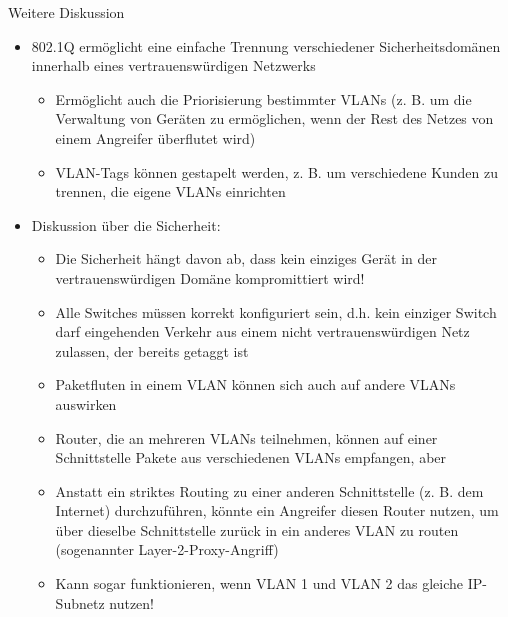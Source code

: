 \documentclass[a4paper]{article}
\begin{document}
\begin{multicols}{3}
    Weitere Diskussion

    \begin{itemize}
        \item
              802.1Q ermöglicht eine einfache Trennung verschiedener
              Sicherheitsdomänen innerhalb eines vertrauenswürdigen Netzwerks

              \begin{itemize}
                  \item
                        Ermöglicht auch die Priorisierung bestimmter VLANs (z. B. um die
                        Verwaltung von Geräten zu ermöglichen, wenn der Rest des Netzes von
                        einem Angreifer überflutet wird)
                  \item
                        VLAN-Tags können gestapelt werden, z. B. um verschiedene Kunden zu
                        trennen, die eigene VLANs einrichten
              \end{itemize}
        \item
              Diskussion über die Sicherheit:

              \begin{itemize}
                  \item
                        Die Sicherheit hängt davon ab, dass kein einziges Gerät in der
                        vertrauenswürdigen Domäne kompromittiert wird!
                  \item
                        Alle Switches müssen korrekt konfiguriert sein, d.h. kein einziger
                        Switch darf eingehenden Verkehr aus einem nicht vertrauenswürdigen
                        Netz zulassen, der bereits getaggt ist
                  \item
                        Paketfluten in einem VLAN können sich auch auf andere VLANs
                        auswirken
                  \item
                        Router, die an mehreren VLANs teilnehmen, können auf einer
                        Schnittstelle Pakete aus verschiedenen VLANs empfangen, aber
                  \item
                        Anstatt ein striktes Routing zu einer anderen Schnittstelle (z. B.
                        dem Internet) durchzuführen, könnte ein Angreifer diesen Router
                        nutzen, um über dieselbe Schnittstelle zurück in ein anderes VLAN zu
                        routen (sogenannter Layer-2-Proxy-Angriff)
                  \item
                        Kann sogar funktionieren, wenn VLAN 1 und VLAN 2 das gleiche
                        IP-Subnetz nutzen!
              \end{itemize}
    \end{itemize}



\end{multicols}
\end{document}
